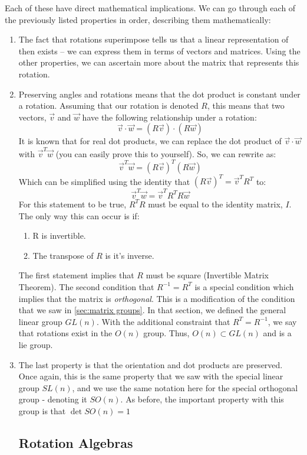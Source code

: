 Each of these have direct mathematical implications. We can go through each of the previously listed properties in order, describing them mathematically:
\begin{enumerate}
    \item The fact that rotations superimpose tells us that a linear representation of then exists -- we can express them in terms of vectors and matrices. Using the other properties, we can ascertain more about the matrix that represents this rotation.
    \item Preserving angles and rotations means that the dot product is constant under a rotation. Assuming that our rotation is denoted $R$, this means that two vectors, $\vec{v}$ and $\vec{w}$ have the following relationship under a rotation:
    \begin{equation}\label{eq:dotty dot prod}
        \vec{v}\cdot \vec{w}=(R\vec{v})\cdot(R\vec{w})
    \end{equation}
    It is known that for real dot products, we can replace the dot product of $\vec{v}\cdot \vec{w}$ with $\vec{v}^T \vec{w}$ (you can easily prove this to yourself). So, we can rewrite  as:
 \begin{equation}
        \vec{v}^T \vec{w}=(R\vec{v})^T(R\vec{w})
    \end{equation}
Which can be simplified using the identity that $(R\vec{v})^T =\vec{v}^T R^T $ to:
 \begin{equation}
        \vec{v}^T \vec{w}=\vec{v}^T R^T R\vec{w}
    \end{equation}
For this statement to be true, $R^T R$ must be equal to the identity matrix, $I$. The only way this can occur is if:
\begin{enumerate}
    \item R is invertible.
    \item     The transpose of $R$ is it's inverse.
\end{enumerate}
The first statement implies that $R$ must be square (Invertible Matrix Theorem). The second condition that $R^{-1}=R^T $ is a special condition which implies that the matrix is \textit{orthogonal}. This is a modification of the condition that we saw in \autoref{sec:matrix groups}. In that section, we defined the general linear group $GL(n)$. With the additional constraint that $R^T =R^{-1}$, we say that rotations exist in the $O(n)$ group. Thus, $O(n) \subset GL(n)$ and is a \gls{lie group}.

    \item The last property is that the orientation and dot products are preserved. Once again, this is the same property that we saw with the special linear group $SL(n)$, and we use the same notation here for the special orthogonal group - denoting it $SO(n)$. As before, the important property with this group is that $\det SO(n) = 1$

\subsection{Rotation Algebras}
    
\end{enumerate}
